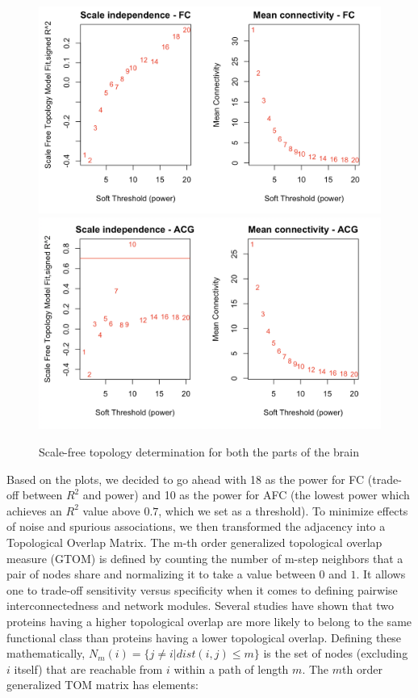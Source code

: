 \begin{figure}
    \centering
    \includegraphics[width=\textwidth]{./Figures/WGCNA/add_scale_FC.png}
    \includegraphics[width=\textwidth]{./Figures/WGCNA/add_scale_ACG.png}
    \caption{Scale-free topology determination for both the parts of the brain}
    \label{Fig: Scale-free}
\end{figure}

Based on the plots, we decided to go ahead with 18 as the power for FC (trade-off between $R^2$ and power) and 10 as the power for AFC (the lowest power which achieves an $R^2$ value above $0.7$, which we set as a threshold). To minimize effects of noise and spurious associations, we then transformed the adjacency into a Topological Overlap Matrix. The m-th order generalized topological overlap measure (GTOM) is defined by counting the number of m-step neighbors that a pair of nodes share and normalizing it to take a value between $0$ and $1$. It allows one to trade-off sensitivity versus specificity when it comes to defining pairwise interconnectedness and network modules. Several studies have shown that two proteins having a higher topological overlap are more likely to belong to the same functional class than proteins having a lower topological overlap. Defining these mathematically, $N_m(i) = \{j \neq i|dist(i, j) \leq m\}$ is the set of nodes (excluding $i$ itself) that are reachable from $i$ within a path of length $m$. The $m$th order generalized TOM matrix has elements:\\

